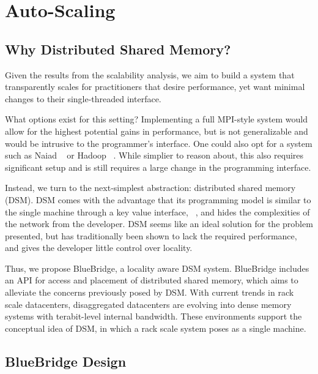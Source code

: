 \section{Auto-Scaling}
\label{sec:autoscaling}

\subsection{Why Distributed Shared Memory?}

Given the results from the scalability analysis, we aim to build a system that
transparently scales for practitioners that desire performance, yet want minimal
changes to their single-threaded interface.

What options exist for this setting? Implementing a full MPI-style system would
allow for the highest potential gains in performance, but is not generalizable
and would be intrusive to the programmer's interface. One could also opt for a
system such as Naiad ~\cite{Murray:2013:NTD:2517349.2522738} or Hadoop
~\cite{Vavilapalli:2013:AHY:2523616.2523633}. While simplier to reason about, 
this also requires significant setup and is still requires a large change in the 
programming interface. 

Instead, we turn to the next-simplest abstraction: distributed shared memory (DSM).
DSM comes with the advantage that its programming model is similar to the
single machine through a key value interface, ~\cite{Power:2010:PBF:1924943.1924964}, 
and hides the complexities of the network from the developer. DSM seems like an
ideal solution for the problem presented, but has traditionally been shown to lack
the required performance, and gives the developer little control over locality. 

Thus, we propose BlueBridge, a locality aware DSM system. BlueBridge includes
an API for access and placement of distributed shared memory, which aims to
alleviate the concerns previously posed by DSM. With current trends in rack
scale datacenters, disaggregated datacenters are evolving into dense memory
systems with terabit-level internal bandwidth. These environments support the 
conceptual idea of DSM, in which a rack scale system poses as a single machine. 

\subsection{BlueBridge Design}

